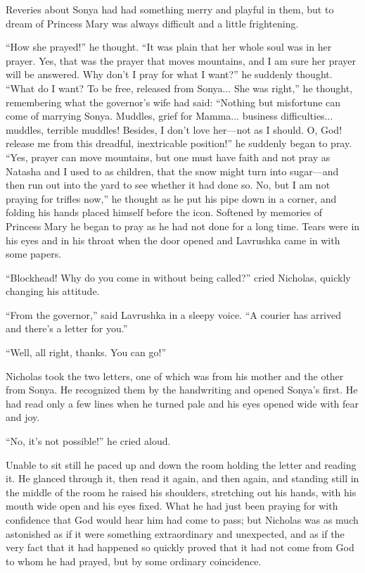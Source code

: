 Reveries about Sonya had had something merry and playful in them,
but to dream of Princess Mary was always difficult and a little
frightening.

``How she prayed!'' he thought. ``It was plain that her whole
soul was in her prayer. Yes, that was the prayer that moves
mountains, and I am sure her prayer will be answered. Why don't I
pray for what I want?'' he suddenly thought. ``What do I want? To
be free, released from Sonya...  She was right,'' he thought,
remembering what the governor's wife had said: ``Nothing but
misfortune can come of marrying Sonya. Muddles, grief for
Mamma... business difficulties... muddles, terrible muddles!
Besides, I don't love her---not as I should. O, God! release me
from this dreadful, inextricable position!'' he suddenly began to
pray. ``Yes, prayer can move mountains, but one must have faith
and not pray as Natasha and I used to as children, that the snow
might turn into sugar---and then run out into the yard to see
whether it had done so. No, but I am not praying for trifles
now,'' he thought as he put his pipe down in a corner, and
folding his hands placed himself before the icon. Softened by
memories of Princess Mary he began to pray as he had not done for
a long time. Tears were in his eyes and in his throat when the
door opened and Lavrushka came in with some papers.

``Blockhead! Why do you come in without being called?'' cried
Nicholas, quickly changing his attitude.

``From the governor,'' said Lavrushka in a sleepy voice. ``A
courier has arrived and there's a letter for you.''

``Well, all right, thanks. You can go!''

Nicholas took the two letters, one of which was from his mother
and the other from Sonya. He recognized them by the handwriting
and opened Sonya's first. He had read only a few lines when he
turned pale and his eyes opened wide with fear and joy.

``No, it's not possible!'' he cried aloud.

Unable to sit still he paced up and down the room holding the
letter and reading it. He glanced through it, then read it again,
and then again, and standing still in the middle of the room he
raised his shoulders, stretching out his hands, with his mouth
wide open and his eyes fixed.  What he had just been praying for
with confidence that God would hear him had come to pass; but
Nicholas was as much astonished as if it were something
extraordinary and unexpected, and as if the very fact that it had
happened so quickly proved that it had not come from God to whom
he had prayed, but by some ordinary coincidence.

